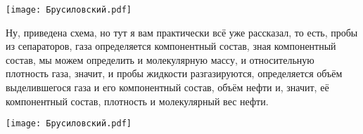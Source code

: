 \documentclass[main.tex]{subfiles}
\begin{document}
\begin{center}
\texttt{[image: Брусиловский.pdf]}
\end{center}

Ну, приведена схема, но тут я вам практически всё уже рассказал, то есть, пробы из сепараторов, газа определяется компонентный состав, зная компонентный состав, мы можем определить и молекулярную массу, и относительную плотность газа, значит, и пробы жидкости разгазируются, определяется объём выделившегося газа и его компонентный состав, объём нефти и, значит, её компонентный состав, плотность и молекулярный вес нефти.

\begin{center}
\texttt{[image: Брусиловский.pdf]}
\end{center}
\end{document}

